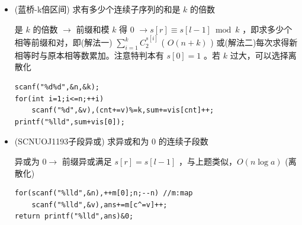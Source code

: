 \documentclass[twocolumn,10pt]{ctexart}
\begin{document}
\begin{itemize}
\item (蓝桥-k倍区间) 求有多少个连续子序列的和是 $k$ 的倍数

是 $k$ 的倍数 $\to$ 前缀和模 $k$ 得 $0$ $\to s[r]\equiv s[l-1]\bmod k$ ，即求多少个相等前缀和对，即(解法一) $\sum_{i=1}^k C_2^{s[i]}$ ( $O(n+k)$ ) 或(解法二)每次求得新相等时与原本相等数累加。注意特判本有 $s[0]=1$ 。若 $k$ 过大，可以选择离散化

\begin{verbatim}
scanf("%d%d",&n,&k);
for(int i=1;i<=n;++i)
    scanf("%d",&v),(cnt+=v)%=k,sum+=vis[cnt]++;
printf("%lld",sum+vis[0]);
\end{verbatim}
\end{itemize}

\begin{itemize}
\item (SCNUOJ1193子段异或) 求异或和为 $0$ 的连续子段数

异或为 $0\to$ 前缀异或满足 $s[r]=s[l-1]$ ，与上题类似，$O(n\log a)$ (离散化)

\begin{verbatim}
for(scanf("%lld",&n),++m[0];n;--n) //m:map
    scanf("%lld",&v),ans+=m[c^=v]++;
return printf("%lld",ans)&0;
\end{verbatim}
\end{itemize}
\end{document}
